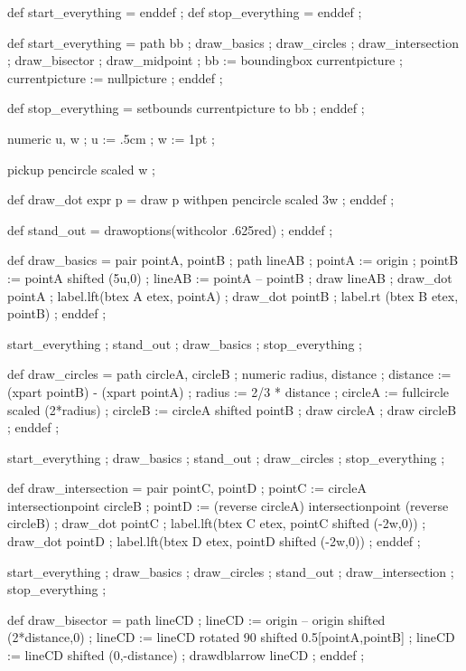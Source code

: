 \startbuffer[a]
def start_everything = enddef ;
def stop_everything = enddef ;
\stopbuffer

\startbuffer[a]
def start_everything =
  path bb ;
  draw_basics ;
  draw_circles ;
  draw_intersection ;
  draw_bisector ;
  draw_midpoint ;
  bb := boundingbox currentpicture ;
  currentpicture := nullpicture ;
enddef ;

def stop_everything =
  setbounds currentpicture to bb ;
enddef ;
\stopbuffer

\startbuffer[b]
numeric u, w ; u := .5cm ; w := 1pt ;

pickup pencircle scaled w ;

def draw_dot expr p =
  draw p withpen pencircle scaled 3w ;
enddef ;

def stand_out =
  drawoptions(withcolor .625red) ;
enddef ;
\stopbuffer

\startbuffer[c]
def draw_basics =
  pair pointA, pointB ; path lineAB ;
  pointA := origin ; pointB := pointA shifted (5u,0) ;
  lineAB := pointA -- pointB ;
  draw lineAB ;
  draw_dot pointA ; label.lft(btex A etex, pointA) ;
  draw_dot pointB ; label.rt (btex B etex, pointB) ;
enddef ;
\stopbuffer

\startbuffer[1]
start_everything ;
  stand_out ; draw_basics ;
stop_everything ;
\stopbuffer

\startbuffer[d]
def draw_circles =
  path circleA, circleB ; numeric radius, distance ;
  distance := (xpart pointB) - (xpart pointA) ;
  radius := 2/3 * distance ;
  circleA := fullcircle scaled (2*radius) ;
  circleB := circleA shifted pointB ;
  draw circleA ; draw circleB ;
enddef ;
\stopbuffer

\startbuffer[2]
start_everything ;
  draw_basics ; stand_out ; draw_circles ;
stop_everything ;
\stopbuffer

\startbuffer[e]
def draw_intersection =
  pair pointC, pointD ;
  pointC := circleA intersectionpoint circleB ;
  pointD := (reverse circleA) intersectionpoint (reverse circleB) ;
  draw_dot pointC ; label.lft(btex C etex, pointC shifted (-2w,0)) ;
  draw_dot pointD ; label.lft(btex D etex, pointD shifted (-2w,0)) ;
enddef ;
\stopbuffer

\startbuffer[3]
start_everything ;
  draw_basics ; draw_circles ; stand_out ; draw_intersection ;
stop_everything ;
\stopbuffer

\startbuffer[f]
def draw_bisector =
  path lineCD ;
  lineCD := origin -- origin shifted (2*distance,0) ;
  lineCD := lineCD rotated 90 shifted 0.5[pointA,pointB] ;
  lineCD := lineCD shifted (0,-distance) ; drawdblarrow lineCD ;
enddef ;
\stopbuffer


